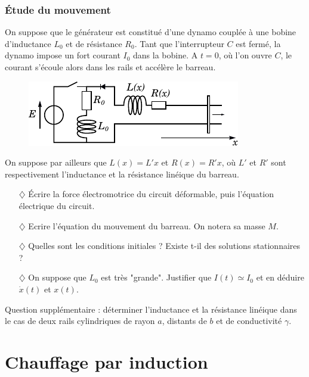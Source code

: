 \documentclass{report}
\begin{document}
\subsubsection*{Étude du mouvement}

On suppose que le générateur est constitué d'une dynamo couplée à une bobine d'inductance $L_0$ et de résistance $R_0$. Tant que l'interrupteur $C$ est fermé, la dynamo impose un fort courant $I_0$ dans la bobine. A $t=0$, où l'on ouvre $C$, le courant s'écoule alors dans les rails et accélère le barreau. 

\begin{figure}[h!]
\centering
		\includegraphics[scale=1]{induction2.pdf}
\end{figure}

On suppose par ailleurs que $L(x)=L'x$ et $R(x)=R'x$, où $L'$ et $R'$ sont respectivement l'inductance et la résistance linéique du barreau.

\begin{itemize}

	\item[$\diamondsuit$] Écrire la force électromotrice du circuit déformable, puis l'équation électrique du circuit. 
	
	\item[$\diamondsuit$] Ecrire l'équation du mouvement du barreau. On notera sa masse $M$. 
	
	\item[$\diamondsuit$] Quelles sont les conditions initiales ? Existe t-il des solutions stationnaires ?
	
	\item[$\diamondsuit$] On suppose que $L_0$ est très "grande". Justifier que $I(t)\simeq I_0$ et en déduire $\dot{x}(t)$ et $x(t)$.

\end{itemize}

Question supplémentaire : déterminer l'inductance et la résistance linéique dans le cas de deux rails cylindriques de rayon $a$, distants de $b$ et de conductivité $\gamma$.

\newpage

\section*{Chauffage par induction}
\end{document}
